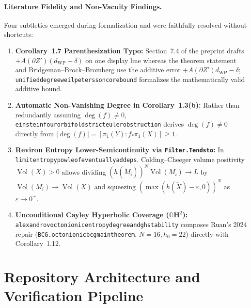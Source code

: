 \documentclass[10pt]{article}
\renewcommand{\_}{\origus\allowbreak}
\newcommand{\Oct}{\mathbb{O}}
\newcommand{\Hyp}{\mathbf{H}}
\newcommand{\Vol}{\operatorname{Vol}}
\newcommand{\code}[1]{\texttt{#1}}
\begin{document}
\paragraph{Literature Fidelity and Non-Vacuity Findings.}
Four subtleties emerged during formalization and were faithfully resolved without shortcuts:
\begin{enumerate}
\item \textbf{Corollary~1.7 Parenthesization Typo:} Section~7.4 of the preprint drafts
$+ A(\partial Z')(d_{\mathrm{WP}} - \delta)$ on one display line whereas the theorem statement and
Bridgeman--Brock--Bromberg \cite{Bridgeman23} use the additive error $+ A(\partial Z')d_{\mathrm{WP}} - \delta$;
\code{unified\_degree\_weil\_petersson\_core\_bound} formalizes the mathematically valid additive bound.
\item \textbf{Automatic Non-Vanishing Degree in Corollary~1.3(b):} Rather than redundantly assuming
$\deg(f) \neq 0$, \code{einstein\_four\_orbifold\_strict\_euler\_obstruction} derives $\deg(f) \neq 0$
directly from $|\deg(f)| = [\pi_1(Y) : f_*\pi_1(X)] \ge 1$.
\item \textbf{Reviron Entropy Lower-Semicontinuity via \code{Filter.Tendsto}:} In
\code{limit\_entropy\_pow\_le\_of\_eventually\_add\_eps}, Colding--Cheeger volume positivity
$\Vol(X) > 0$ allows dividing $(h(\widetilde{M}_i))^N \Vol(M_i) \to L$ by $\Vol(M_i) \to \Vol(X)$ and
squeezing $(\max(h(\widetilde{X}) - \varepsilon, 0))^N$ as $\varepsilon \to 0^+$.
\item \textbf{Unconditional Cayley Hyperbolic Coverage ($\Oct\Hyp^2$):}
\code{alexandrov\_octonionic\_entropy\_degree\_and\_gh\_stability} composes Ruan's 2024 repair
\cite{Rua24} (\code{BCG.octonionic\_bcg\_main\_theorem}, $N = 16, h_0 = 22$) directly with
Corollary~1.12.
\end{enumerate}

\section{Repository Architecture and Verification Pipeline}
\end{document}
